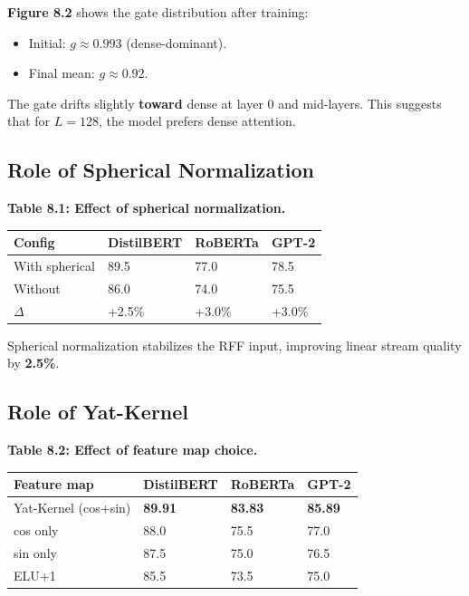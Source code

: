 \textbf{Figure 8.2} shows the gate distribution after training:

\begin{itemize}
\item Initial: $g \approx 0.993$ (dense-dominant).
\item Final mean: $g \approx 0.92$.

\end{itemize}
The gate drifts slightly \textbf{toward} dense at layer 0 and mid-layers. This 
suggests that for $L = 128$, the model prefers dense attention.

\subsection{Role of Spherical Normalization}

\textbf{Table 8.1: Effect of spherical normalization.}

\begin{table}[H]
\centering
\small
\begin{tabular}{llll}
\toprule
\textbf{Config} & \textbf{DistilBERT} & \textbf{RoBERTa} & \textbf{GPT-2} \\
\midrule
With spherical & 89.5 & 77.0 & 78.5 \\
Without & 86.0 & 74.0 & 75.5 \\
$\Delta$ & +2.5\% & +3.0\% & +3.0\% \\
\bottomrule
\end{tabular}
\end{table}

Spherical normalization stabilizes the RFF input, improving linear stream 
quality by \textbf{2.5\%}.

\subsection{Role of Yat-Kernel}

\textbf{Table 8.2: Effect of feature map choice.}

\begin{table}[H]
\centering
\small
\begin{tabular}{llll}
\toprule
\textbf{Feature map} & \textbf{DistilBERT} & \textbf{RoBERTa} & \textbf{GPT-2} \\
\midrule
Yat-Kernel (cos+sin) & \textbf{89.91} & \textbf{83.83} & \textbf{85.89} \\
cos only & 88.0 & 75.5 & 77.0 \\
sin only & 87.5 & 75.0 & 76.5 \\
ELU+1 & 85.5 & 73.5 & 75.0 \\
\bottomrule
\end{tabular}
\end{table}

